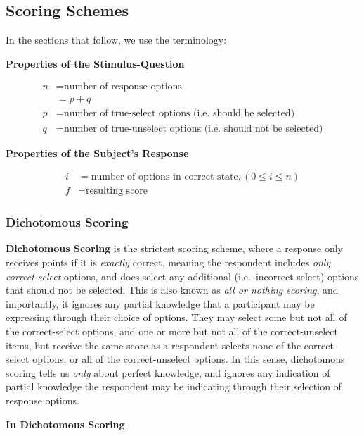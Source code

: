 \documentclass[
  letterpaper,
  DIV=11,
  numbers=noendperiod]{scrreprt}
\begin{document}
\hypertarget{scoring-schemes}{%
\subsection{Scoring Schemes}\label{scoring-schemes}}

In the sections that follow, we use the terminology:

\textbf{Properties of the Stimulus-Question}

\begin{align}
n &= \text{number of response options} \\  
  &= p + q \\ 
  p &= \text{number of true-select options (i.e. should be selected)} \\
  q &= \text{number of true-unselect options (i.e. should not be selected)} 
\end{align}

\textbf{Properties of the Subject's Response}

\begin{align} 
i &= \text{number of options in correct state}, (0 ≤ i ≤ n) \\ 
f &= \text{resulting score} 
\end{align}

\hypertarget{sec-absolute-scoring}{%
\subsubsection{Dichotomous Scoring}\label{sec-absolute-scoring}}

\textbf{Dichotomous Scoring} is the strictest scoring scheme, where a
response only receives points if it is \emph{exactly} correct, meaning
the respondent includes \emph{only correct-select} options, and does
select any additional (i.e.~incorrect-select) options that should not be
selected. This is also known as \emph{all or nothing scoring}, and
importantly, it ignores any partial knowledge that a participant may be
expressing through their choice of options. They may select some but not
all of the correct-select options, and one or more but not all of the
correct-unselect items, but receive the same score as a respondent
selects none of the correct-select options, or all of the
correct-unselect options. In this sense, dichotomous scoring tells us
\emph{only} about perfect knowledge, and ignores any indication of
partial knowledge the respondent may be indicating through their
selection of response options.

\textbf{In Dichotomous Scoring}
\end{document}

